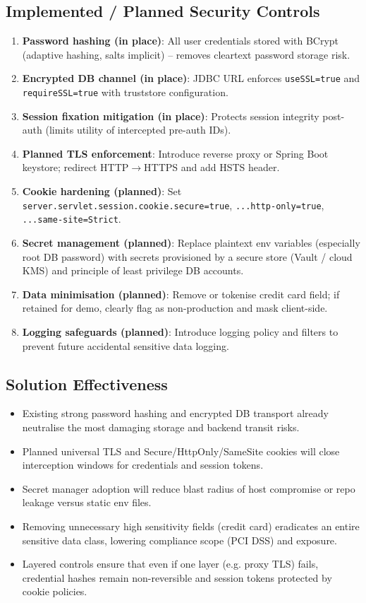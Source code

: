 \documentclass[]{UCD_CS_FYP_Report}
\begin{document}
\subsection{Implemented / Planned Security Controls}
\begin{enumerate}
	\item \textbf{Password hashing (in place)}: All user credentials stored with BCrypt (adaptive hashing, salts implicit) -- removes cleartext password storage risk.
	\item \textbf{Encrypted DB channel (in place)}: JDBC URL enforces \texttt{useSSL=true} and \texttt{requireSSL=true} with truststore configuration.
	\item \textbf{Session fixation mitigation (in place)}: Protects session integrity post-auth (limits utility of intercepted pre-auth IDs).
	\item \textbf{Planned TLS enforcement}: Introduce reverse proxy or Spring Boot keystore; redirect HTTP\;$\rightarrow$\;HTTPS and add HSTS header.
	\item \textbf{Cookie hardening (planned)}: Set \texttt{server.servlet.session.cookie.secure=true}, \texttt{...http-only=true}, \texttt{...same-site=Strict}.
	\item \textbf{Secret management (planned)}: Replace plaintext env variables (especially root DB password) with secrets provisioned by a secure store (Vault / cloud KMS) and principle of least privilege DB accounts.
	\item \textbf{Data minimisation (planned)}: Remove or tokenise credit card field; if retained for demo, clearly flag as non-production and mask client-side.
	\item \textbf{Logging safeguards (planned)}: Introduce logging policy and filters to prevent future accidental sensitive data logging.
\end{enumerate}

\subsection{Solution Effectiveness}
\begin{itemize}
	\item Existing strong password hashing and encrypted DB transport already neutralise the most damaging storage and backend transit risks.
	\item Planned universal TLS and Secure/HttpOnly/SameSite cookies will close interception windows for credentials and session tokens.
	\item Secret manager adoption will reduce blast radius of host compromise or repo leakage versus static env files.
	\item Removing unnecessary high sensitivity fields (credit card) eradicates an entire sensitive data class, lowering compliance scope (PCI DSS) and exposure.
	\item Layered controls ensure that even if one layer (e.g. proxy TLS) fails, credential hashes remain non-reversible and session tokens protected by cookie policies.
\end{itemize}
\end{document}
